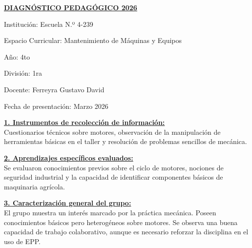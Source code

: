 \documentclass[a4paper]{article}
\begin{document}
\begin{center}
\fontsize{12pt}{14pt}\selectfont\bfseries\underline{DIAGNÓSTICO PEDAGÓGICO 2026}
\end{center}

\noindent Institución: Escuela N.º 4-239 \par
\noindent Espacio Curricular: Mantenimiento de Máquinas y Equipos \par
\noindent Año: 4to \par
\noindent División: 1ra \par
\noindent Docente: Ferreyra Gustavo David \par
\noindent Fecha de presentación: Marzo 2026

\vspace{0.5cm}
\noindent\textbf{\underline{1. Instrumentos de recolección de información:}}\\
\fontsize{11pt}{13pt}\selectfont Cuestionarios técnicos sobre motores, observación de la manipulación de herramientas básicas en el taller y resolución de problemas sencillos de mecánica.

\vspace{0.5cm}
\noindent\textbf{\underline{2. Aprendizajes específicos evaluados:}}\\
\fontsize{11pt}{13pt}\selectfont Se evaluaron conocimientos previos sobre el ciclo de motores, nociones de seguridad industrial y la capacidad de identificar componentes básicos de maquinaria agrícola.

\vspace{0.5cm}
\noindent\textbf{\underline{3. Caracterización general del grupo:}}\\
\fontsize{11pt}{13pt}\selectfont El grupo muestra un interés marcado por la práctica mecánica. Poseen conocimientos básicos pero heterogéneos sobre motores. Se observa una buena capacidad de trabajo colaborativo, aunque es necesario reforzar la disciplina en el uso de EPP.
\end{document}
